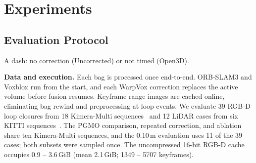 \section{Experiments}
\label{sec:experiments}

\subsection{Evaluation Protocol}

\begin{table}[t]
\centering
\caption{\textbf{Mean reconstruction accuracy and core time at
0.25 m.}}
\label{tab:broad_main}
\scriptsize
\setlength{\tabcolsep}{1.7pt}
\parbox{\columnwidth}{\vspace{2pt}\scriptsize A dash: no correction (Uncorrected) or not timed (Open3D).}
\end{table}

\noindent\textbf{Data and execution.}
Each bag is processed once end-to-end. ORB-SLAM3 and Voxblox run from the start, and each WarpVox
correction replaces the active volume before fusion resumes. Keyframe range
images are cached online, eliminating bag rewind and preprocessing
at loop events. We
evaluate 39 RGB-D loop closures from 18 Kimera-Multi
sequences~\cite{tian23arxiv_kimeramultiexperiments} and 12 LiDAR cases from
six KITTI sequences~\cite{Geiger2013IJRR}. The PGMO comparison, repeated
correction, and ablation share ten Kimera-Multi sequences, and the 0.10\,m
evaluation uses 11 of the 39 cases; both subsets were sampled once. The uncompressed 16-bit RGB-D
cache occupies 0.9 -- 3.6\,GiB (mean 2.1\,GiB; 1349 -- 5707 keyframes).

